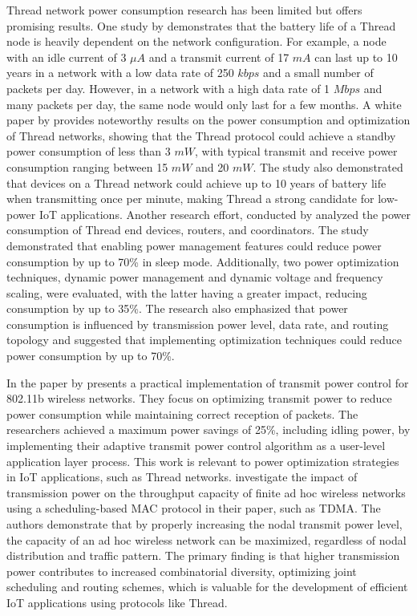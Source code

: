 Thread network power consumption research has been limited but offers promising results. One study by \textcite{semiconductor_battery_2021} demonstrates that the battery life of a Thread node is heavily dependent on the network configuration. For example, a node with an idle current of 3 $\mu A$ and a transmit current of 17 $mA$ can last up to 10 years in a network with a low data rate of 250 $kbps$ and a small number of packets per day. However, in a network with a high data rate of 1 $Mbps$ and many packets per day, the same node would only last for a few months. A white paper by \textcite{Thread_Low_Power_2018} provides noteworthy results on the power consumption and optimization of Thread networks, showing that the Thread protocol could achieve a standby power consumption of less than 3 $mW$, with typical transmit and receive power consumption ranging between 15 $mW$ and 20 $mW$. The study also demonstrated that devices on a Thread network could achieve up to 10 years of battery life when transmitting once per minute, making Thread a strong candidate for low-power \gls{IoT} applications. Another research effort, conducted by \textcite{azoidou2017battery} analyzed the power consumption of Thread end devices, routers, and coordinators. The study demonstrated that enabling power management features could reduce power consumption by up to 70\% in sleep mode. Additionally, two power optimization techniques, dynamic power management and dynamic voltage and frequency scaling, were evaluated, with the latter having a greater impact, reducing consumption by up to 35\%. The research also emphasized that power consumption is influenced by transmission power level, data rate, and routing topology and suggested that implementing optimization techniques could reduce power consumption by up to 70\%.

In the paper by \textcite{sheth2002implementation} presents a practical implementation of transmit power control for 802.11b wireless networks. They focus on optimizing transmit power to reduce power consumption while maintaining correct reception of packets. The researchers achieved a maximum power savings of 25\%, including idling power, by implementing their adaptive transmit power control algorithm as a user-level application layer process. This work is relevant to power optimization strategies in \gls{IoT} applications, such as Thread networks. \textcite{1576539} investigate the impact of transmission power on the throughput capacity of finite ad hoc wireless networks using a scheduling-based \gls{MAC} protocol in their paper, such as \gls{TDMA}. The authors demonstrate that by properly increasing the nodal transmit power level, the capacity of an ad hoc wireless network can be maximized, regardless of nodal distribution and traffic pattern. The primary finding is that higher transmission power contributes to increased combinatorial diversity, optimizing joint scheduling and routing schemes, which is valuable for the development of efficient \gls{IoT} applications using protocols like Thread.

